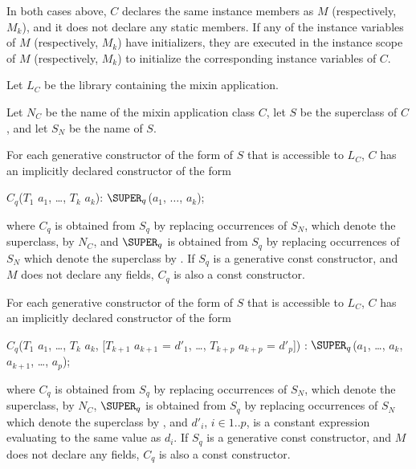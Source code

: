 \documentclass[makeidx]{article}
\begin{document}
\LMHash{}%
In both cases above, $C$ declares the same instance members as $M$ (respectively, $M_k$),
and it does not declare any static members.
If any of the instance variables of $M$ (respectively, $M_k$) have initializers,
they are executed in the instance scope of $M$ (respectively, $M_k$)
to initialize the corresponding instance variables of $C$.

\LMHash{}%
Let $L_C$ be the library containing the mixin application.

Let $N_C$ be the name of the mixin application class $C$,
let $S$ be the superclass of $C$, and let $S_N$ be the name of $S$.

For each generative constructor of the form  of $S$ that is accessible to $L_C$, $C$ has an implicitly declared constructor of the form

\begin{normativeDartCode}
$C_q$($T_{1}$ $a_{1}$, \ldots, $T_{k}$ $a_{k}$): $\SUPER_q$($a_{1}$, $\ldots$, $a_{k}$);
\end{normativeDartCode}

\noindent
where $C_q$ is obtained from $S_q$ by replacing occurrences of $S_N$,
which denote the superclass, by $N_C$, and $\SUPER_q$ is obtained from $S_q$ by
replacing occurrences of $S_N$ which denote the superclass by \SUPER{}.
If $S_q$ is a generative const constructor, and $M$ does not declare any
fields, $C_q$ is also a const constructor.

\LMHash{}%
For each generative constructor of the form  of $S$ that is accessible to $L_C$, $C$ has an implicitly declared constructor of the form

\begin{normativeDartCode}
$C_q$($T_{1}$ $a_{1}$, \ldots , $T_{k}$ $a_{k}$, [$T_{k+1}$ $a_{k+1}$ = $d'_{1}$, \ldots , $T_{k+p}$ $a_{k+p}$ = $d'_p$])
    : $\SUPER_q$($a_{1}$, \ldots , $a_{k}$, $a_{k+1}$, \ldots, $a_p$);
\end{normativeDartCode}

\noindent
where $C_q$ is obtained from $S_q$ by replacing occurrences of $S_N$,
which denote the superclass, by $N_C$,
$\SUPER_q$ is obtained from $S_q$ by replacing occurrences of $S_N$
which denote the superclass by \SUPER{},
and $d'_i$, $i \in 1..p$, is a constant expression evaluating
to the same value as $d_i$.
If $S_q$ is a generative const constructor, and $M$ does not declare any
fields, $C_q$ is also a const constructor.
\end{document}

